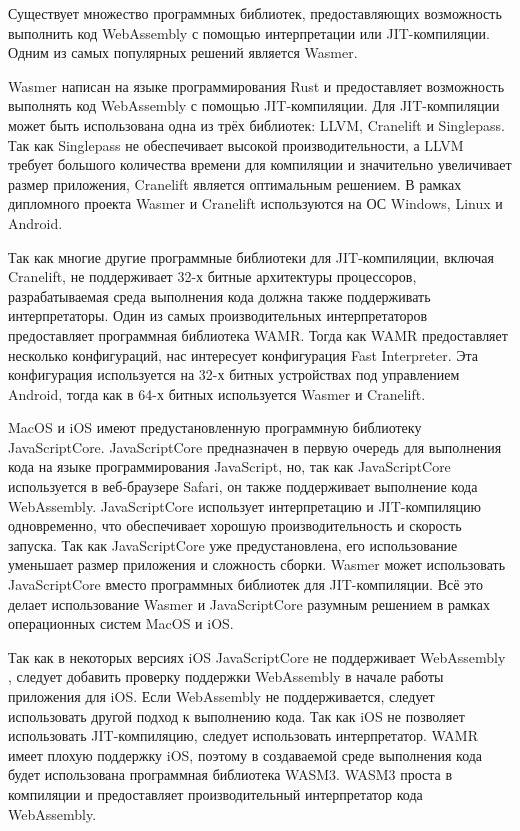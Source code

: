 Существует множество программных библиотек, предоставляющих возможность выполнить код WebAssembly с помощью интерпретации или JIT-компиляции.
Одним из самых популярных решений является Wasmer.

Wasmer написан на языке программирования Rust и предоставляет возможность выполнять код WebAssembly с помощью JIT-компиляции.
Для JIT-компиляции может быть использована одна из трёх библиотек: LLVM, Cranelift и Singlepass.
Так как Singlepass не обеспечивает высокой производительности, а LLVM требует большого количества времени для компиляции \cite{WasmerRuntimes} и значительно увеличивает размер приложения, Cranelift является оптимальным решением.
В рамках дипломного проекта Wasmer и Cranelift используются на ОС Windows, Linux и Android.

Так как многие другие программные библиотеки для JIT-компиляции, включая Cranelift, не поддерживает 32-х битные архитектуры процессоров, разрабатываемая среда выполнения кода должна также поддерживать интерпретаторы.
Один из самых производительных интерпретаторов предоставляет программная библиотека WAMR.
Тогда как WAMR предоставляет несколько конфигураций, нас интересует конфигурация Fast Interpreter.
Эта конфигурация используется на 32-х битных устройствах под управлением Android, тогда как в 64-х битных используется Wasmer и Cranelift.

MacOS и iOS имеют предустановленную программную библиотеку JavaScriptCore.
JavaScriptCore предназначен в первую очередь для выполнения кода на языке программирования JavaScript, но, так как JavaScriptCore используется в веб-браузере Safari, он также поддерживает выполнение кода WebAssembly.
JavaScriptCore использует интерпретацию и JIT-компиляцию одновременно, что обеспечивает хорошую производительность и скорость запуска.
Так как JavaScriptCore уже предустановлена, его использование уменьшает размер приложения и сложность сборки.
Wasmer может использовать JavaScriptCore вместо программных библиотек для JIT-компиляции.
Всё это делает использование Wasmer и JavaScriptCore разумным решением в рамках операционных систем MacOS и iOS.

Так как в некоторых версиях iOS JavaScriptCore не поддерживает WebAssembly \cite{JSCNoWasm}, следует добавить проверку поддержки WebAssembly в начале работы приложения для iOS.
Если WebAssembly не поддерживается, следует использовать другой подход к выполнению кода.
Так как iOS не позволяет использовать JIT-компиляцию, следует использовать интерпретатор.
WAMR имеет плохую поддержку iOS, поэтому в создаваемой среде выполнения кода будет использована программная библиотека WASM3.
WASM3 проста в компиляции и предоставляет производительный интерпретатор кода WebAssembly.

